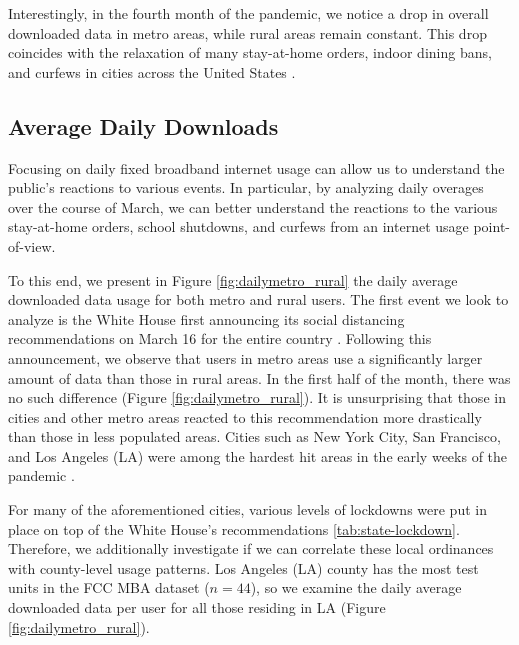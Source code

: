 Interestingly, in the fourth month of the pandemic, we notice a drop in overall downloaded data in metro areas, while rural areas remain constant. This drop coincides with the relaxation of many stay-at-home orders, indoor dining bans, and curfews in cities across the United States \cite{money2020la,gov2020nyc}. 


\subsection{Average Daily Downloads}
Focusing on daily fixed broadband internet usage can allow us to understand the public's reactions to various events. In particular, by analyzing daily overages over the course of March, we can better understand the reactions to the various stay-at-home orders, school shutdowns, and curfews from an internet usage point-of-view. 

To this end, we present in Figure \ref{fig:dailymetro_rural} the daily average downloaded data usage for both metro and rural users. The first event we look to analyze is the White House first announcing its social distancing recommendations on March 16 for the entire country \cite{trump2020coronavirus}. Following this announcement, we observe that users in metro areas use a significantly larger amount of data than those in rural areas. In the first half of the month, there was no such difference (Figure \ref{fig:dailymetro_rural}). It is unsurprising that those in cities and other metro areas reacted to this recommendation more drastically than those in less populated areas. Cities such as New York City, San Francisco, and Los Angeles (LA) were among the hardest hit areas in the early weeks of the pandemic \cite{cdc2020tracker}. 

For many of the aforementioned cities, various levels of lockdowns were put in place on top of the White House's recommendations \ref{tab:state-lockdown}. Therefore, we additionally investigate if we can correlate these local ordinances with county-level usage patterns. Los Angeles (LA) county has the most test units in the FCC MBA dataset ($n=44$), so we examine the daily average downloaded data per user for all those residing in LA (Figure \ref{fig:dailymetro_rural}). 


